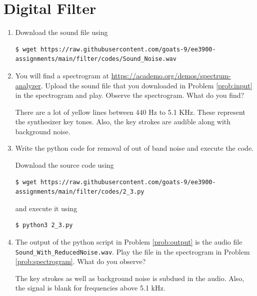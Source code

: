 \documentclass[journal,12pt,twocolumn]{IEEEtran}
\renewcommand\thesection{\arabic{section}}
\begin{document}
\section{Digital Filter}
\begin{enumerate}[label=\thesection.\arabic*
,ref=\thesection.\theenumi]
\item
\label{prob:input}
Download the sound file using
\begin{lstlisting}
$ wget https://raw.githubusercontent.com/goats-9/ee3900-assignments/main/filter/codes/Sound_Noise.wav
\end{lstlisting}
\item
\label{prob:spectrogram}
You will find a spectrogram at \href{https://academo.org/demos/spectrum-analyzer}{\url{https://academo.org/demos/spectrum-analyzer}}. Upload the sound file that you downloaded in Problem \ref{prob:input} in the spectrogram and play. Observe the spectrogram. What do you find?

\solution There are a lot of yellow lines between 440 Hz to 5.1 KHz.  These represent the synthesizer key tones. Also, the key strokes
are audible along with background noise.
\item
\label{prob:output}
Write the python code for removal of out of band noise and execute the code.

\solution
Download the source code using
\begin{lstlisting}
$ wget https://raw.githubusercontent.com/goats-9/ee3900-assignments/main/filter/codes/2_3.py
\end{lstlisting}
and execute it using
\begin{lstlisting}
$ python3 2_3.py
\end{lstlisting}
\item
The output of the python script in Problem \ref{prob:output} is the audio file \texttt{Sound\_With\_ReducedNoise.wav}. Play the file in the spectrogram in Problem \ref{prob:spectrogram}. What do you observe?

\solution The key strokes as well as background noise is subdued in the audio. Also, the signal is blank for frequencies above 5.1 kHz.

\end{enumerate}
\end{document}
